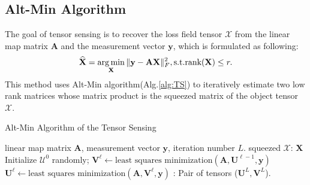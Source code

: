 \documentclass[futureinternet,article,submit,moreauthors,pdftex,10pt,a4paper]{Definitions/mdpi}
\theoremstyle{plain}
\theoremstyle{definition}
\theoremstyle{remark}
\begin{document}
\subsection{Alt-Min Algorithm}
    The goal of tensor sensing is to recover the loss field tensor $\mathcal{X}$ from the linear map matrix $\mathbf{A}$ and the measurement vector $\mathbf{y}$, which is formulated as following:
    \begin{equation}
        \label{eqa:lstm}
        \widehat{\mathbf{X}} = \mathop{\arg\min}_{\mathbf{X}}  \| \mathbf{y} - \mathbf{A}\mathbf{X} \|_F^2 , \\ 
        \text{s.t.} \text{rank}(\mathbf{X}) \leq r .
    \end{equation}
    This method uses Alt-Min algorithm(Alg.\ref{alg:TS}) to iteratively estimate two low rank matrices whose matrix product is the squeezed matrix of the object tensor $\mathcal{X}$. 
\begin{algorithm}[htb]
    \caption{Alt-Min Algorithm of the Tensor Sensing}
    \label{alg:TS}
    \begin{algorithmic}[1]
        \Require
        linear map matrix $\mathbf{A}$, measurement vector $\mathbf{y}$, iteration number $L$.
        \Ensure squeezed $\mathcal{X} $: $\mathbf{X}$
        \State Initialize $\mathcal{U}^0$ randomly;
            \State $\mathbf{V}^{\ell} \gets \text{least squares minimization}(\mathbf{A}, \mathbf{U}^{\ell -1}, \mathbf{y} )$
            \State $\mathbf{U}^{\ell} \gets \text{least squares minimization}(\mathbf{A}, \mathbf{V}^{\ell}, \mathbf{y})$
            \EndFor
        \Ensure: Pair of tensors ($\mathbf{U}^L, \mathbf{V}^L$).
    \end{algorithmic}
\end{algorithm}
\end{document}
